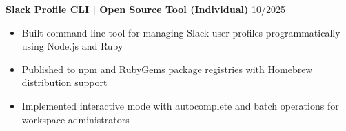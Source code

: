\noindent
\textbf{Slack Profile CLI | Open Source Tool (Individual)} \hfill 10/2025
\begin{itemize}
    \item Built command-line tool for managing Slack user profiles programmatically using Node.js and Ruby
    \item Published to npm and RubyGems package registries with Homebrew distribution support
    \item Implemented interactive mode with autocomplete and batch operations for workspace administrators
\end{itemize}
